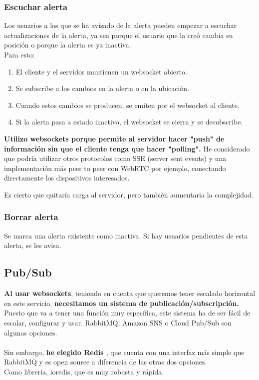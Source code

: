 \subsubsection{Escuchar alerta}\label{subsec:websocket}
Los usuarios a los que se ha avisado de la alerta pueden empezar a escuchar actualizaciones de la alerta,
ya sea porque el usuario que la creó cambia su posición o porque la alerta es ya inactiva. \\
Para esto:
\begin{enumerate}
	\item El cliente y el servidor mantienen un websocket abierto.
	\item Se subscribe a los cambios en la alerta o en la ubicación.
	\item Cuando estos cambios se producen, se emiten por el websocket al cliente.
	\item Si la alerta pasa a estado inactivo, el websocket se cierra y se desubscribe.
\end{enumerate}
\textbf{Utilizo websockets porque permite al servidor hacer "push" de información sin que el cliente tenga que hacer "polling".}
He considerado que podría utilizar otros protocolos como SSE (server sent events) y una implementación más peer to peer con WebRTC por ejemplo, conectando directamente los dispositivos interesados.

Es cierto que quitaría carga al servidor, pero también aumentaria la complejidad.

\subsubsection{Borrar alerta}
Se marca una alerta existente como inactiva. Si hay usuarios pendientes de esta alerta, se les avisa.


\subsection{Pub/Sub}\label{sec:pubsub}
\textbf{Al usar websockets}, teniendo en cuenta que queremos tener escalado horizontal en este servicio,
\textbf{necesitamos un sistema de publicación/subscripción.} \\
Puesto que va a tener una función muy específica, este sistema ha de ser fácil de escalar, configurar y usar.
RabbitMQ, Amazon SNS o Cloud Pub/Sub son algunas opciones. \\ \\
Sin embargo, \textbf{he elegido Redis \cite{redis}}, que cuenta con una interfaz más simple que RabbitMQ y es open source a diferencia de las otras dos opciones.\\ 
Como librería, ioredis, que es muy robusta y rápida.\\ \\

